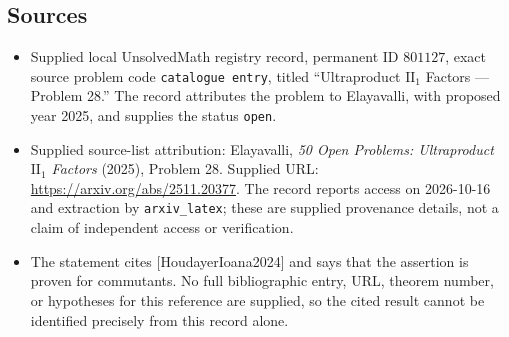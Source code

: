 \documentclass[11pt]{article}
\begin{document}
\subsection{Sources}
\begin{itemize}
\item Supplied local UnsolvedMath registry record, permanent ID $801127$, exact source problem code \texttt{catalogue entry}, titled ``Ultraproduct $\mathrm{II}_1$ Factors --- Problem 28.'' The record attributes the problem to Elayavalli, with proposed year 2025, and supplies the status \texttt{open}.
\item Supplied source-list attribution: Elayavalli, \emph{50 Open Problems: Ultraproduct $\mathrm{II}_1$ Factors} (2025), Problem 28. Supplied URL: \url{https://arxiv.org/abs/2511.20377}. The record reports access on 2026-10-16 and extraction by \texttt{arxiv\_latex}; these are supplied provenance details, not a claim of independent access or verification.
\item The statement cites [HoudayerIoana2024] and says that the assertion is proven for commutants. No full bibliographic entry, URL, theorem number, or hypotheses for this reference are supplied, so the cited result cannot be identified precisely from this record alone.
\end{itemize}
\end{document}
